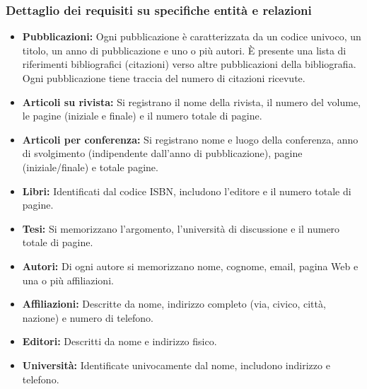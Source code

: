 \documentclass[a4paper,12pt]{article}
\begin{document}
\subsubsection{Dettaglio dei requisiti su specifiche entità e relazioni}
\begin{itemize}[label=\textbullet]
    \item \textbf{Pubblicazioni:} Ogni pubblicazione è caratterizzata da un codice univoco, un titolo, un anno di pubblicazione e uno o più autori. È presente una lista di riferimenti bibliografici (citazioni) verso altre pubblicazioni della bibliografia. Ogni pubblicazione tiene traccia del numero di citazioni ricevute.
    
    \item \textbf{Articoli su rivista:} Si registrano il nome della rivista, il numero del volume, le pagine (iniziale e finale) e il numero totale di pagine.
    
    \item \textbf{Articoli per conferenza:} Si registrano nome e luogo della conferenza, anno di svolgimento (indipendente dall'anno di pubblicazione), pagine (iniziale/finale) e totale pagine.
    
    \item \textbf{Libri:} Identificati dal codice ISBN, includono l'editore e il numero totale di pagine.
    
    \item \textbf{Tesi:} Si memorizzano l'argomento, l'università di discussione e il numero totale di pagine.
    
    \item \textbf{Autori:} Di ogni autore si memorizzano nome, cognome, email, pagina Web e una o più affiliazioni.
    
    \item \textbf{Affiliazioni:} Descritte da nome, indirizzo completo (via, civico, città, nazione) e numero di telefono.
    
    \item \textbf{Editori:} Descritti da nome e indirizzo fisico.
    
    \item \textbf{Università:} Identificate univocamente dal nome, includono indirizzo e telefono.
\end{itemize}
\end{document}
